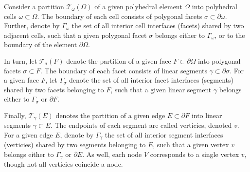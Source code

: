 	Consider a partition $\mathcal{T}_\omega (\Omega)$ of a given polyhedral element $\Omega$ into polyhedral cells $\omega \subset \Omega$. The boundary of each cell consists of polygonal facets $\sigma \subset \partial \omega$. Further, denote by $\Gamma_\omega$ the set of all interior cell interfaces (facets) shared by two adjacent cells, such that a given polygonal facet $\sigma$ belongs either to $\Gamma_\omega$, or to the boundary of the element $\partial \Omega$.
	
	In turn, let $\mathcal{T}_{\sigma} (F)$ denote the partition of a given face $F \subset \partial \Omega$ into polygonal facets $\sigma \subset F$. The boundary of each facet consists of linear segments $\gamma \subset \partial \sigma$. For a given face $F$, let $\Gamma_\sigma$ denote the set of all interior facet interfaces (segments) shared by two facets belonging to $F$, such that a given linear segment $\gamma$ belongs either to $\Gamma_\sigma$ or $\partial F$.
	
	Finally, $\mathcal{T}_{\gamma} (E)$ denotes the partition of a given edge $E \subset \partial F$ into linear segments $\gamma \subset E$. The endpoints of each segment are called verticies, denoted $v$. For a given edge $E$, denote by $\Gamma_\gamma$ the set of all interior segment interfaces (verticies) shared by two segments belonging to $E$, such that a given vertex $v$ belongs either to $\Gamma_\gamma$ or $\partial E$. As well, each node $V$ corresponds to a single vertex $v$, though not all verticies coincide a node.
	
